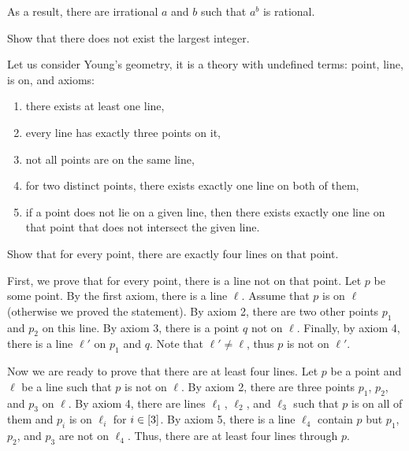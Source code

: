\begin{chapterendexercises}
\begin{solution}
          As a result, there are irrational $a$ and $b$ such that $a^b$ is
          rational.
        \end{solution}
    \exercise[recommended] Show that there does not exist the largest integer.

    \exercise Let us consider Young's geometry, it is a theory with undefined
        terms: point, line, is on, and axioms:
        \begin{enumerate}
            \item there exists at least one line,
            \item every line has exactly three points on it,
            \item not all points are on the same line,
            \item for two distinct points, there exists exactly one line on both of
              them,
            \item if a point does not lie on a given line, then there exists exactly
              one line on that point that does not intersect the given line.
        \end{enumerate}

        Show that for every point, there are exactly four lines on that point.
        \begin{solution}
          First, we prove that for every point, there is a line not on that
          point. Let $p$ be some point. By the first axiom, there is a line
          $\ell$. Assume that $p$ is on $\ell$ (otherwise we proved the
          statement). By axiom 2, there are two other points $p_1$ and $p_2$ on
          this line. By axiom 3, there is a point $q$ not on $\ell$. Finally, by
          axiom 4, there is a line $\ell'$ on $p_1$ and $q$. Note that $\ell'
          \neq \ell$, thus $p$ is not on $\ell'$.
          
          Now we are ready to prove that there are at least four lines. Let $p$
          be a point and $\ell$ be a line such that $p$ is not on $\ell$. By
          axiom 2, there are three points $p_1$, $p_2$, and $p_3$ on $\ell$. By
          axiom 4, there are lines $\ell_1$, $\ell_2$, and $\ell_3$ such that
          $p$ is on all of them and $p_i$ is on $\ell_i$ for $i \in {[{3}]}$.
          By axiom 5, there is a line $\ell_4$ contain $p$ but $p_1$, $p_2$,
          and $p_3$  are not on $\ell_4$. Thus, there are at least four lines
          through $p$.



\end{solution}
\end{chapterendexercises}
